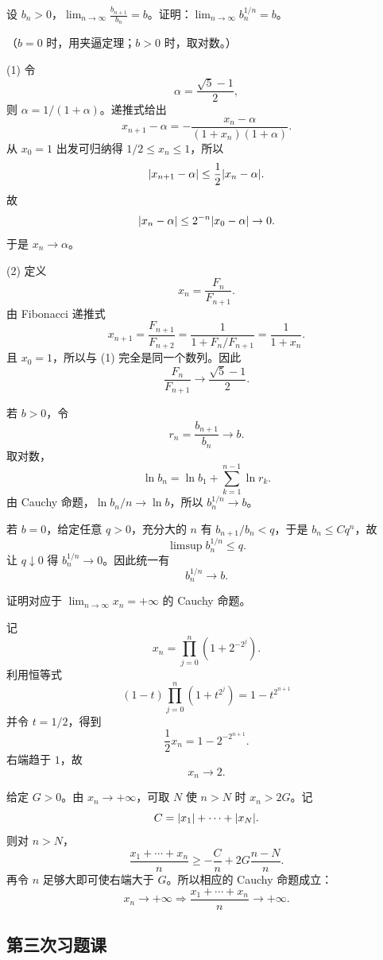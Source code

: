 \begin{xexercise}[3]
设 $b_n>0$，$\displaystyle\lim_{n\to\infty}\frac{b_{n+1}}{b_n}=b$。证明：$\displaystyle\lim_{n\to\infty}b_n^{1/n}=b$。

  （$b=0$ 时，用夹逼定理；$b>0$ 时，取对数。）
\end{xexercise}
\begin{xsolution}
(1) 令
\[
  \alpha=\frac{\sqrt5-1}{2},
\]
则 $\alpha=1/(1+\alpha)$。递推式给出
\[
  x_{n+1}-\alpha
  =-\frac{x_n-\alpha}{(1+x_n)(1+\alpha)}.
\]
从 $x_0=1$ 出发可归纳得 $1/2\le x_n\le1$，所以
\[
  \lvert x_{n+1}-\alpha\rvert\le\frac12\lvert x_n-\alpha\rvert.
\]
故
\[
  \lvert x_n-\alpha\rvert\le2^{-n}\lvert x_0-\alpha\rvert\to0.
\]
于是 $x_n\to\alpha$。

(2) 定义
\[
  x_n=\frac{F_n}{F_{n+1}}.
\]
由 Fibonacci 递推式
\[
  x_{n+1}=\frac{F_{n+1}}{F_{n+2}}
  =\frac1{1+F_n/F_{n+1}}
  =\frac1{1+x_n}.
\]
且 $x_0=1$，所以与 (1) 完全是同一个数列。因此
\[
  \boxed{\frac{F_n}{F_{n+1}}\to\frac{\sqrt5-1}{2}}.
\]

若 $b>0$，令
\[
  r_n=\frac{b_{n+1}}{b_n}\to b.
\]
取对数，
\[
  \ln b_n=\ln b_1+\sum_{k=1}^{n-1}\ln r_k.
\]
由 Cauchy 命题，$\ln b_n/n\to\ln b$，所以 $b_n^{1/n}\to b$。

若 $b=0$，给定任意 $q>0$，充分大的 $n$ 有 $b_{n+1}/b_n<q$，于是 $b_n\le Cq^n$，故
\[
  \limsup b_n^{1/n}\le q.
\]
让 $q\downarrow0$ 得 $b_n^{1/n}\to0$。因此统一有
\[
  \boxed{b_n^{1/n}\to b}.
\]
\end{xsolution}


\begin{xexercise}[4]
证明对应于 $\displaystyle\lim_{n\to\infty}x_n=+\infty$ 的 Cauchy 命题。
\end{xexercise}
\begin{xsolution}
记
\[
  x_n=\prod_{j=0}^n\left(1+2^{-2^j}\right).
\]
利用恒等式
\[
  (1-t)\prod_{j=0}^n(1+t^{2^j})=1-t^{2^{n+1}}
\]
并令 $t=1/2$，得到
\[
  \frac12x_n=1-2^{-2^{n+1}}.
\]
右端趋于 $1$，故
\[
  \boxed{x_n\to2}.
\]

给定 $G>0$。由 $x_n\to+\infty$，可取 $N$ 使 $n>N$ 时 $x_n>2G$。记
\[
  C=\lvert x_1\rvert+\cdots+\lvert x_N\rvert.
\]
则对 $n>N$，
\[
  \frac{x_1+\cdots+x_n}{n}
  \ge-\frac Cn+2G\frac{n-N}{n}.
\]
再令 $n$ 足够大即可使右端大于 $G$。所以相应的 Cauchy 命题成立：
\[
  \boxed{x_n\to+\infty\Longrightarrow
  \frac{x_1+\cdots+x_n}{n}\to+\infty}.
\]
\end{xsolution}


\subsection{第三次习题课}

